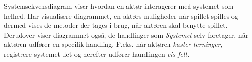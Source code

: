 Systemsekvensdiagram viser hvordan en aktør interagerer med systemet som helhed. Har visualisere diagrammet, en aktørs muligheder når spillet spilles og dermed vises de metoder der tages i brug, når aktøren skal benytte spillet. Derudover viser diagrammet også, de handlinger som \textit{Systemet} selv foretager, når aktøren udfører en specifik handling. F.eks. når aktøren \textit{kaster terninger}, registrere systemet det og herefter udfører handlingen \textit{vis felt.}  
        

        
    
    
    
